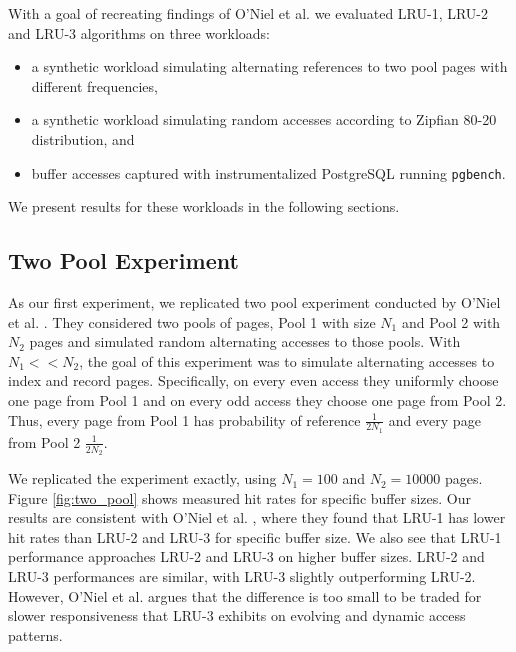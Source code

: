 With a goal of recreating findings of O'Niel et al. \cite{lruk} we evaluated LRU-1, LRU-2 and LRU-3 algorithms on three workloads:
\begin{itemize}
\item a synthetic workload simulating alternating references to two pool pages with different frequencies,
\item a synthetic workload simulating random accesses according to Zipfian 80-20 distribution, and
\item buffer accesses captured with instrumentalized PostgreSQL running \texttt{pgbench}.
\end{itemize}

We present results for these workloads in the following sections.

\subsection{Two Pool Experiment}

As our first experiment, we replicated two pool experiment conducted by O'Niel et al. \cite{lruk}. They considered two pools of pages, Pool 1 with size $N_1$ and Pool 2 with $N_2$ pages and simulated random alternating accesses to those pools. With $N_1 << N_2$, the goal of this experiment was to simulate alternating accesses to index and record pages. Specifically, on every even access they uniformly choose one page from Pool 1 and on every odd access they choose one page from Pool 2. Thus, every page from Pool 1 has probability of reference $\frac{1}{2N_1}$ and every page from Pool 2 $\frac{1}{2N_2}$.

We replicated the experiment exactly, using $N_1 = 100$ and $N_2 = 10000$ pages. Figure \ref{fig:two_pool} shows measured hit rates for specific buffer sizes. Our results are consistent with O'Niel et al. \cite{lruk}, where they found that LRU-1 has lower hit rates than LRU-2 and LRU-3 for specific buffer size. We also see that LRU-1 performance approaches LRU-2 and LRU-3 on higher buffer sizes. LRU-2 and LRU-3 performances are similar, with LRU-3 slightly outperforming LRU-2. However, O'Niel et al. argues that the difference is too small to be traded for slower responsiveness that LRU-3 exhibits on evolving and dynamic access patterns.

